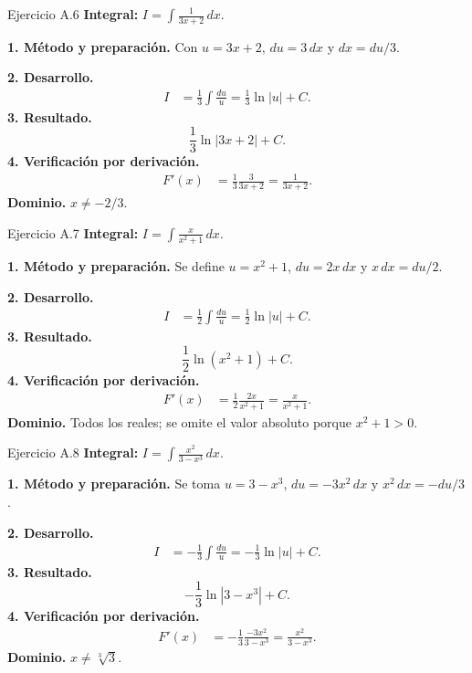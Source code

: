 \begin{examplebox}{Ejercicio A.6}
\textbf{Integral:} $\displaystyle I=\int \frac1{3x+2}\,dx$.

\textbf{1. Método y preparación.} Con $u=3x+2$, $du=3\,dx$ y $dx=du/3$.

\textbf{2. Desarrollo.}
\begin{align*}
I&=\frac13\int\frac{du}{u}=\frac13\ln|u|+C.
\end{align*}
\textbf{3. Resultado.}
\[
\frac13\ln|3x+2|+C.
\]
\textbf{4. Verificación por derivación.}
\begin{align*}
F'(x)&=\frac13\frac3{3x+2}=\frac1{3x+2}.
\end{align*}
\textbf{Dominio.} $x\ne-2/3$.
\end{examplebox}

\begin{examplebox}{Ejercicio A.7}
\textbf{Integral:} $\displaystyle I=\int \frac{x}{x^2+1}\,dx$.

\textbf{1. Método y preparación.} Se define $u=x^2+1$, $du=2x\,dx$ y $x\,dx=du/2$.

\textbf{2. Desarrollo.}
\begin{align*}
I&=\frac12\int\frac{du}{u}=\frac12\ln|u|+C.
\end{align*}
\textbf{3. Resultado.}
\[
\frac12\ln(x^2+1)+C.
\]
\textbf{4. Verificación por derivación.}
\begin{align*}
F'(x)&=\frac12\frac{2x}{x^2+1}=\frac{x}{x^2+1}.
\end{align*}
\textbf{Dominio.} Todos los reales; se omite el valor absoluto porque $x^2+1>0$.
\end{examplebox}

\begin{examplebox}{Ejercicio A.8}
\textbf{Integral:} $\displaystyle I=\int \frac{x^2}{3-x^3}\,dx$.

\textbf{1. Método y preparación.} Se toma $u=3-x^3$, $du=-3x^2\,dx$ y $x^2\,dx=-du/3$.

\textbf{2. Desarrollo.}
\begin{align*}
I&=-\frac13\int\frac{du}{u}=-\frac13\ln|u|+C.
\end{align*}
\textbf{3. Resultado.}
\[
-\frac13\ln|3-x^3|+C.
\]
\textbf{4. Verificación por derivación.}
\begin{align*}
F'(x)&=-\frac13\frac{-3x^2}{3-x^3}=\frac{x^2}{3-x^3}.
\end{align*}
\textbf{Dominio.} $x\ne\sqrt[3]3$.
\end{examplebox}

